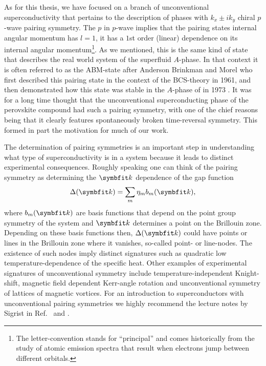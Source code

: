 As for this thesis, we have focused on a branch of unconventional superconductivity that pertains to the description of phases with
$k_x\pm ik_y$ chiral $p$-wave pairing symmetry. The $p$ in $p$-wave implies that the pairing states internal angular momentum has $l=1$, \ie it has a $1$st order (linear) dependence
on its internal angular momentum\footnote{The letter-convention stands for ``principal'' and comes historically from the study of atomic emission spectra 
that result when electrons jump between different orbitals.}. As we mentioned, this is the same kind of state that describes the real world system of the
 superfluid $A$-phase. In that context it is often referred to as the ABM-state after Anderson Brinkman and Morel who first described this pairing
state in the context of the BCS-theory \cite{Anderson61} in 1961, and then demonstrated how this state was stable in the $A$-phase
of  in 1973 \cite{Anderson73}. It was for a long time thought that the unconventional superconducting phase of the perovskite compound 
had such a pairing symmetry, with one of the chief reasons being that it clearly features spontaneously broken time-reversal symmetry. This
formed in part the motivation for much of our work.

The determination of pairing symmetries is an important step in understanding what type of superconductivity is in a system because it leads to distinct
experimental consequences. Roughly speaking one can think of the pairing symmetry as determining the $\v{k}$ dependence of the gap function
\begin{equation}
    \label{eq:Intro:GapFunc}
    \Delta(\v{k}) = \sum_{m}\eta_mb_m(\v{k}),
\end{equation}
where $b_m(\v{k})$ are basis functions that depend on the point group symmetry of the system and $\v{k}$ determines a point on the Brillouin zone. Depending
on these basis functions then, $\Delta(\v{k})$ could have points or lines in the Brillouin zone where it vanishes, so-called point- or line-nodes. The 
existence of such nodes imply distinct signatures such as quadratic low temperature-dependence of the specific heat. Other examples of experimental signatures
of unconventional symmetry include
temperature-independent Knight-shift, magnetic field dependent Kerr-angle rotation and unconventional symmetry of lattices of magnetic vortices. For an introduction to superconductors with
unconventional pairing symmetries we highly recommend the lecture notes by Sigrist in Ref.~\cite{Sigrist05} and \cite{Sigrist09}.

